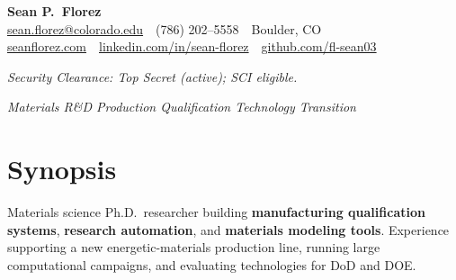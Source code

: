 \documentclass[letterpaper,10pt]{article}
\newcommand{\keepsection}{\needspace{6\baselineskip}}
\begin{document}
\pagestyle{empty}

\begin{center}
    {\LARGE \textbf{Sean P.\ Florez}}\\
    \href{mailto:sean.florez@colorado.edu}{sean.florez@colorado.edu} \,\textbar\, (786) 202--5558 \,\textbar\, Boulder, CO\\
    \href{https://seanflorez.com}{seanflorez.com} \,\textbar\,
    \href{https://linkedin.com/in/sean-florez}{linkedin.com/in/sean-florez} \,\textbar\,
    \href{https://github.com/fl-sean03}{github.com/fl-sean03}
\end{center}

\vspace{-2pt}
\begin{center}
\textit{Security Clearance: Top Secret (active); SCI eligible.}
\end{center}

\vspace{-6pt}
\begin{center}
\textit{Materials R\&D \;\textbar\; Production Qualification \;\textbar\; Technology Transition}
\end{center}

\keepsection\section*{Synopsis}
Materials science Ph.D.\ researcher building \textbf{manufacturing qualification systems}, \textbf{research automation}, and \textbf{materials modeling tools}. Experience supporting a new energetic-materials production line, running large computational campaigns, and evaluating technologies for DoD and DOE.
\end{document}
